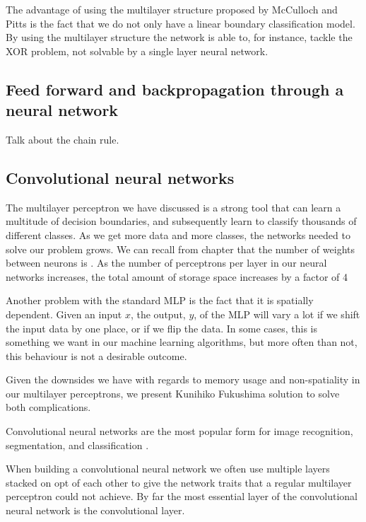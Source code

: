 The advantage of using the multilayer structure proposed by McCulloch and Pitts is the fact that we do not only have a linear boundary classification model. By using the multilayer structure the network is able to, for instance, tackle the XOR problem, not solvable by a single layer neural network.


\subsection{Feed forward and backpropagation through a neural network}
Talk about the chain rule.



    
\subsection{Convolutional neural networks}
The multilayer perceptron we have discussed is a strong tool that can learn a multitude of decision boundaries, and subsequently learn to classify thousands of different classes. 
As we get more data and more classes, the networks needed to solve our problem grows. We can recall from chapter \cite{cha:MLP} that the number of weights between neurons is . As the number of perceptrons per layer in our neural networks increases, the total amount of storage space increases by a factor of 4 

Another problem with the standard MLP is the fact that it is spatially dependent. Given an input $x$, the output, $y$, of the MLP will vary a lot if we shift the input data by one place, or if we flip the data. In some cases, this is something we want in our machine learning algorithms, but more often than not, this behaviour is not a desirable outcome.

Given the downsides we have with regards to memory usage and non-spatiality in our multilayer perceptrons, we present Kunihiko Fukushima \cite{Fukushima1980} solution to solve both complications.

Convolutional neural networks are the most popular form for image recognition, segmentation, and classification \cite{NIPS2012_4824} \cite{Long_2015_CVPR}.

When building a convolutional neural network we often use multiple layers stacked on opt of each other to give the network traits that a regular multilayer perceptron could not achieve. By far the most essential layer of the convolutional neural network is the convolutional layer.


